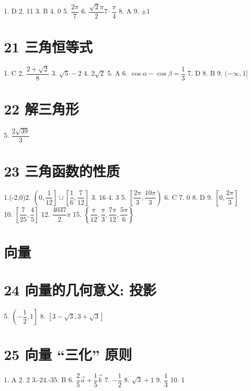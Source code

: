 \documentclass[10pt]{article}
\begin{document}
1. D 2. 11 3. B 4. 0 5. $\dfrac{2\pi }{7}$ 6. $\dfrac{\sqrt{2}\pi }{2}7 \cdot  \dfrac{\pi }{4}$ 8. A 9. $\pm  1$

\section*{21 三角恒等式}

1. C 2. $\dfrac{2 + \sqrt{2}}{8}$ 3. $\sqrt{5} - 2$ 4. $2\sqrt{2}$ 5. A 6. $\cos \alpha  - \cos \beta  = \dfrac{1}{3}$ 7. D 8. B 9. $( - \infty ,1\rbrack$

\section*{22 解三角形}

5. $\dfrac{2\sqrt{39}}{3}$

\section*{23 三角函数的性质}

1.(-2,0)2. $\left( {0,\dfrac{1}{12}}\right\rbrack   \cup  \left\lbrack  {\dfrac{1}{6},\dfrac{7}{12}}\right\rbrack$ 3. 16 4. 3 5. $\left\lbrack  {\dfrac{2\pi }{3},\dfrac{10\pi }{3}}\right)$ 6. C 7. 0 8. D 9. $\left\lbrack  {0,\dfrac{2\pi }{3}}\right\rbrack$ 10. $\left\lbrack  {\dfrac{7}{25},\dfrac{4}{5}}\right\rbrack$ 12. $\dfrac{4037}{2}\pi$ 15. $\left\{  {\dfrac{\pi }{12},\dfrac{\pi }{3},\dfrac{7\pi }{12},\dfrac{5\pi }{6}}\right\}$

\section*{向量}

\section*{24 向量的几何意义: 投影}

5. $\left( {-\dfrac{1}{2},1}\right\rbrack$ 8. $\left\lbrack  {3 - \sqrt{3},3 + \sqrt{3}}\right\rbrack$

\section*{25 向量 “三化” 原则}

1. A 2. 2 3.-24.-35. B 6. $\dfrac{2}{5}\overrightarrow{a} + \dfrac{1}{5}\overrightarrow{b}$ 7. $- \dfrac{1}{2}$ 8. $\sqrt{3} + 1$ 9. $\dfrac{1}{3}$ 10. 1
\end{document}
